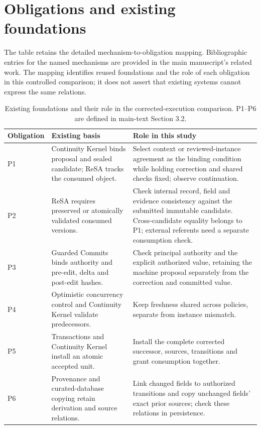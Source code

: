 \section{Obligations and existing foundations}
The table retains the detailed mechanism-to-obligation mapping. Bibliographic
entries for the named mechanisms are provided in the main manuscript's related
work. The mapping identifies reused foundations and the role of each obligation
in this controlled comparison; it does not assert that existing systems cannot
express the same relations.

\begin{table}[tbp]
\caption{Existing foundations and their role in the corrected-execution comparison. P1--P6 are defined in main-text Section 3.2.}\label{tab:obligation-positioning}
\centering\small
\begin{tabularx}{\textwidth}{@{}>{\raggedright\arraybackslash}p{}>{\raggedright\arraybackslash}p{}>{\raggedright\arraybackslash}X@{}}
\toprule
Obligation & Existing basis & Role in this study \\
\midrule
P1 & Continuity Kernel binds proposal and sealed candidate; ReSA tracks the consumed object. & Select context or reviewed-instance agreement as the binding condition while holding correction and shared checks fixed; observe continuation. \\
P2 & ReSA requires preserved or atomically validated consumed versions. & Check internal record, field and evidence consistency against the submitted immutable candidate. Cross-candidate equality belongs to P1; external referents need a separate consumption check. \\
P3 & Guarded Commits binds authority and pre-edit, delta and post-edit hashes. & Check principal authority and the explicit authorized value, retaining the machine proposal separately from the correction and committed value. \\
P4 & Optimistic concurrency control and Continuity Kernel validate predecessors. & Keep freshness shared across policies, separate from instance mismatch. \\
P5 & Transactions and Continuity Kernel install an atomic accepted unit. & Install the complete corrected successor, sources, transitions and grant consumption together. \\
P6 & Provenance and curated-database copying retain derivation and source relations. & Link changed fields to authorized transitions and copy unchanged fields' exact prior sources; check these relations in persistence. \\
\bottomrule
\end{tabularx}
\end{table}

